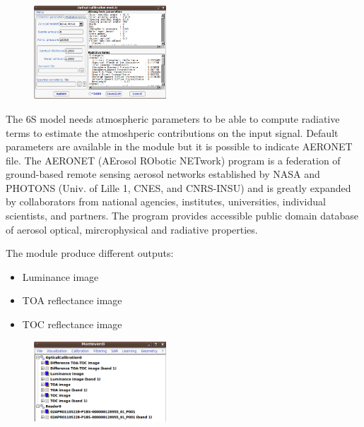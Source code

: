 \begin{figure}
   \center
   \includegraphics[width=0.44\textwidth]{../Art/MonteverdiImages/monteverdi_optical_calibration.png}
   \label{fig:opticalcalibration}
\end{figure}

The 6S model needs atmospheric parameters to be able to compute radiative terms to estimate the atmoshperic contributions on the input
signal. Default parameters are available in the module but it is possible to indicate AERONET file. The AERONET 
(AErosol RObotic NETwork) program is a federation of ground-based remote sensing aerosol networks established by 
NASA and PHOTONS (Univ. of Lille 1, CNES, and CNRS-INSU) and is greatly expanded by collaborators from national 
agencies, institutes, universities, individual scientists, and partners. The program provides accessible public 
domain database of aerosol optical, mircrophysical and radiative properties.

The module produce different outputs:

\begin{itemize}
\item Luminance image
\item TOA reflectance image
\item TOC reflectance image
\end{itemize}


\begin{figure}
   \center
   \includegraphics[width=0.44\textwidth]{../Art/MonteverdiImages/monteverdi_optical_calibration_outputs.png}
   \label{fig:opticalcalibrationoutput}
\end{figure}

